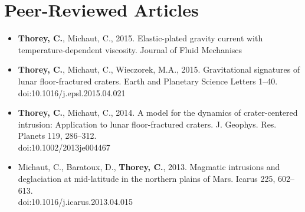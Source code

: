 \documentclass[]{friggeri-cv}
\begin{document}
\section{Peer-Reviewed Articles}
\begin{itemize}
\item \textbf{Thorey, C.}, Michaut,  C., 2015.  Elastic-plated gravity
  current  with  temperature-dependent  viscosity.  Journal  of  Fluid
  Mechaniscs 
\item  \textbf{Thorey,  C.},  Michaut,   C.,  Wieczorek,  M.A.,  2015.
  Gravitational  signatures of  lunar floor-fractured  craters.  Earth
  and Planetary Science Letters
  1–40. \\
  doi:10.1016/j.epsl.2015.04.021
\item \textbf{Thorey, C.}, Michaut, C., 2014. A model for the dynamics
  of crater-centered  intrusion: Application to  lunar floor-fractured
  craters.       J.       Geophys.        Res.       Planets      119,
  286–312. \\
  doi:10.1002/2013je004467
\item Michaut,  C., Baratoux, D., \textbf{Thorey,  C.}, 2013. Magmatic
  intrusions and  deglaciation at mid-latitude in  the northern plains
  of Mars. Icarus 225, 602–613. \\
  doi:10.1016/j.icarus.2013.04.015
\end{itemize}
\end{document}
